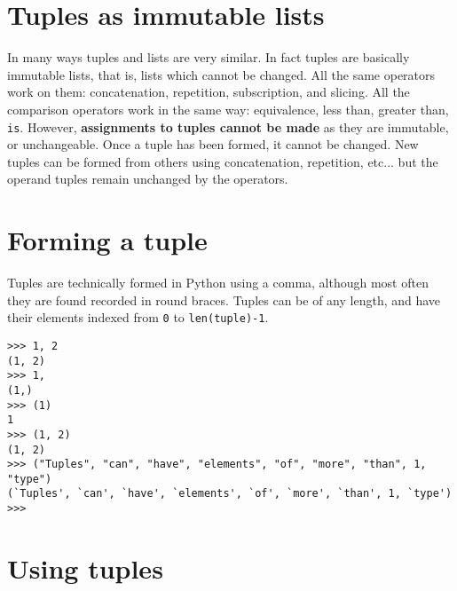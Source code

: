 \section{Tuples as immutable lists}

In many ways tuples and lists are very similar. In fact tuples are   basically immutable lists, that is, lists which cannot be changed. All   the same operators work on them: concatenation, repetition,   subscription, and slicing. All the comparison operators work in the   same way: equivalence, less than, greater than, \texttt{is}. However,   \textbf{assignments to tuples cannot be made} as they are   immutable, or unchangeable.  Once a tuple has been formed, it cannot be   changed. New tuples can be formed from others using concatenation,   repetition, etc... but the operand tuples remain unchanged by the   operators.

\section{Forming a tuple}

Tuples are technically formed in Python using a comma, although most   often they are found recorded in round braces. Tuples can be of any   length, and have their elements indexed from \texttt{0} to \texttt{len(tuple)-1}.
\begin{lstlisting}
>>> 1, 2
(1, 2)
>>> 1, 
(1,)
>>> (1)
1
>>> (1, 2)
(1, 2)
>>> ("Tuples", "can", "have", "elements", "of", "more", "than", 1, "type")
(`Tuples', `can', `have', `elements', `of', `more', `than', 1, `type')
>>>
\end{lstlisting}

\section{Using tuples}

